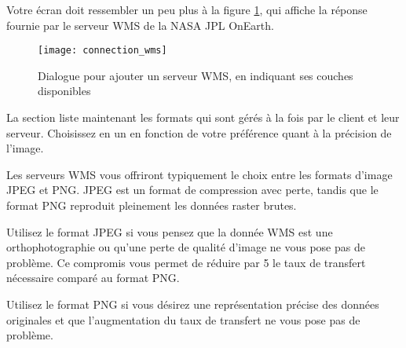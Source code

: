 Votre écran doit ressembler un peu plus à la figure \ref{fig:connection_wms},
qui affiche la réponse fournie par le serveur WMS de la NASA JPL OnEarth.

\begin{figure}[ht]
\centering
\texttt{[image: connection\_wms]}
\caption{Dialogue pour ajouter un serveur WMS, en indiquant ses couches
disponibles \nixcaption}\label{fig:connection_wms}
\end{figure}


La section  liste maintenant les formats qui sont gérés à
la fois par le client et leur serveur. Choisissez en un en fonction de votre
préférence quant à la précision de l'image.

\begin{Tip}[ht]\caption{\textsc{Format d'image}}

Les serveurs WMS vous offriront typiquement le choix entre les
formats d'image JPEG et PNG. JPEG est un format de compression avec perte,
tandis que le format PNG reproduit pleinement les données raster brutes.

Utilisez le format JPEG si vous pensez que la donnée WMS est une
orthophotographie ou qu'une perte de qualité d'image ne vous pose pas de
problème. Ce compromis vous permet de réduire par 5 le taux de transfert
nécessaire comparé au  format PNG.

Utilisez le format PNG si vous désirez une représentation précise des données
originales et que l'augmentation du taux de transfert ne vous pose pas de
problème.
\end{Tip}

